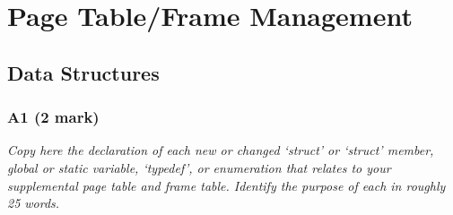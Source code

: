 \documentclass{report}
\newcommand{\question}[1]{\textit{#1} \ }
\begin{document}
	\section*{Page Table/Frame Management}
		\subsection*{Data Structures}
			\subsubsection*{A1 (2 mark)}
				\question{Copy here the declaration of each new or changed 
				`struct' or `struct' member, global or static variable, 
				`typedef', or enumeration that relates to your supplemental 
				page table and frame table. Identify the purpose of each in 
				roughly 25 words.}
				
\end{document}
